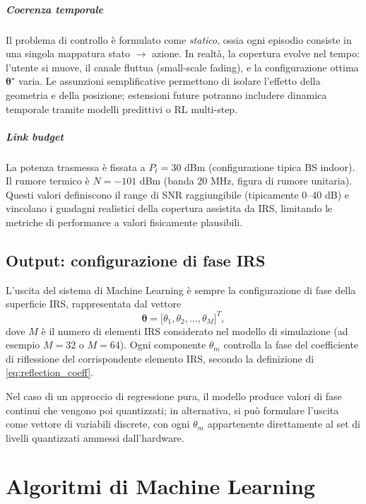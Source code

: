 \documentclass[12pt,a4paper]{report}
\begin{document}
\paragraph{Coerenza temporale}
Il problema di controllo è formulato come \emph{statico}, ossia ogni
episodio consiste in una singola mappatura stato $\rightarrow$
azione. In realtà, la copertura evolve nel tempo: l'utente si muove,
il canale fluttua (small-scale fading), e la configurazione ottima
$\boldsymbol{\theta}^\star$ varia. Le assunzioni semplificative
permettono di isolare l'effetto della geometria e della posizione;
estensioni future potranno includere dinamica temporale tramite
modelli predittivi o RL multi-step.

\paragraph{Link budget}
La potenza trasmessa è fissata a $P_t = 30$ dBm (configurazione
tipica BS indoor). Il rumore termico è $N = -101$ dBm (banda 20 MHz,
figura di rumore unitaria). Questi valori definiscono il range di SNR
raggiungibile (tipicamente 0--40 dB) e vincolano i guadagni
realistici della copertura assistita da IRS, limitando le metriche di
performance a valori fisicamente plausibili.

\section{Output: configurazione di fase IRS}
L'uscita del sistema di Machine Learning è sempre la configurazione
di fase della superficie IRS, rappresentata dal vettore
\[
  \boldsymbol{\theta} =
  \big[\theta_1, \theta_2, \dots, \theta_M\big]^T,
\]
dove $M$ è il numero di elementi IRS considerato nel modello di
simulazione (ad esempio $M=32$ o $M=64$). Ogni componente $\theta_m$
controlla la fase del coefficiente di riflessione del corrispondente
elemento IRS, secondo la definizione di \eqref{eq:reflection_coeff}.

Nel caso di un approccio di regressione pura, il modello produce
valori di fase continui che vengono poi quantizzati; in alternativa,
si può formulare l'uscita come vettore di variabili discrete, con
ogni $\theta_m$ appartenente direttamente al set di livelli
quantizzati ammessi dall'hardware.

\chapter{Algoritmi di Machine Learning}
\label{chap:algoritmi}
\end{document}
